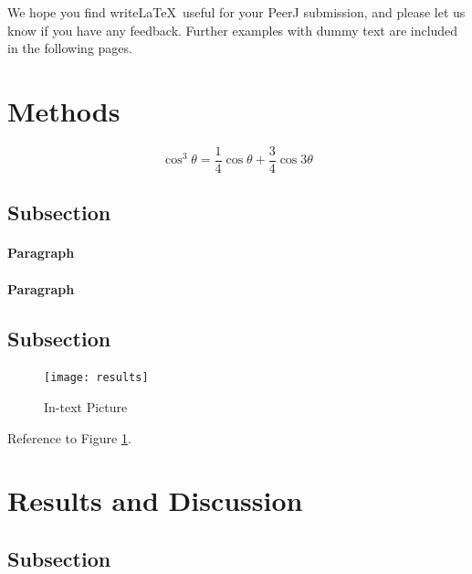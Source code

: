 \documentclass[fleqn,10pt,lineno]{wlpeerj} %
\begin{document}
We hope you find write\LaTeX\ useful for your PeerJ submission, and please let us know if you have any feedback. Further examples with dummy text are included in the following pages.

\section*{Methods}

\lipsum[4] %

\begin{equation}
\cos^3 \theta =\frac{1}{4}\cos\theta+\frac{3}{4}\cos 3\theta
\label{eq:refname2}
\end{equation}

\lipsum[5] %

\subsection*{Subsection}

\lipsum[6] %

\paragraph{Paragraph} \lipsum[7] %
\paragraph{Paragraph} \lipsum[8] %

\subsection*{Subsection}

\lipsum[9] %

\begin{figure}[ht]\centering
\texttt{[image: results]}
\caption{In-text Picture}
\label{fig:results}
\end{figure}

Reference to Figure \ref{fig:results}.

\section*{Results and Discussion}

\lipsum[10] %

\subsection*{Subsection}
\end{document}
